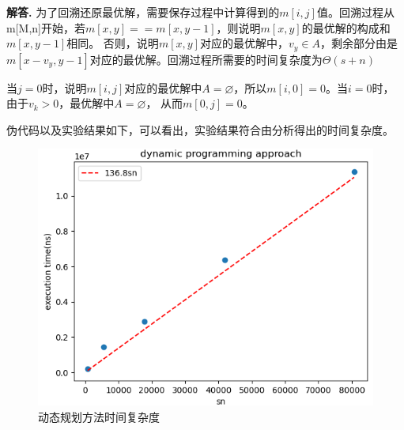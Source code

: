 \documentclass[12pt, a4paper, oneside]{article}
\newenvironment{solution}{\par\noindent\textbf{解答. }}{}
\begin{document}
\begin{solution}
为了回溯还原最优解，需要保存过程中计算得到的$m[i,j]$值。回溯过程从m[M,n]开始，若$m[x,y]==m[x,y-1]$，则说明$m[x,y]$的最优解的构成和$m[x,y-1]$相同。
否则，说明$m[x,y]$对应的最优解中，$v_y\in A$，剩余部分由是$m[x-v_y,y-1]$对应的最优解。回溯过程所需要的时间复杂度为$\Theta(s+n)$

当$j=0$时，说明$m[i,j]$对应的最优解中$A=\varnothing$，所以$m[i,0]=0$。当$i=0$时，由于$v_k>0$，最优解中$A=\varnothing$，
从而$m[0,j]=0$。

伪代码以及实验结果如下，可以看出，实验结果符合由分析得出的时间复杂度。

\begin{figure}[!h]
    \centering
    \includegraphics[scale = 0.6]{dynamic.png}
    \caption{动态规划方法时间复杂度}\label{dynamic}
\end{figure}


\end{solution}
\end{document}
